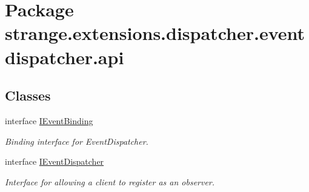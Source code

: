 \hypertarget{namespacestrange_1_1extensions_1_1dispatcher_1_1eventdispatcher_1_1api}{\section{Package strange.\-extensions.\-dispatcher.\-eventdispatcher.\-api}
\label{namespacestrange_1_1extensions_1_1dispatcher_1_1eventdispatcher_1_1api}
}
\subsection*{Classes}
\begin{DoxyCompactItemize}
\item 
interface \hyperlink{interfacestrange_1_1extensions_1_1dispatcher_1_1eventdispatcher_1_1api_1_1_i_event_binding}{I\-Event\-Binding}
\begin{DoxyCompactList}\small\item\em Binding interface for Event\-Dispatcher. \end{DoxyCompactList}\item 
interface \hyperlink{interfacestrange_1_1extensions_1_1dispatcher_1_1eventdispatcher_1_1api_1_1_i_event_dispatcher}{I\-Event\-Dispatcher}
\begin{DoxyCompactList}\small\item\em Interface for allowing a client to register as an observer. \end{DoxyCompactList}\end{DoxyCompactItemize}
